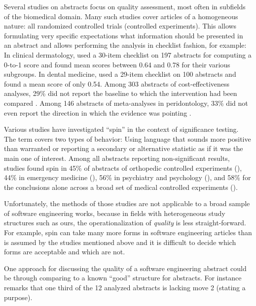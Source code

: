 \documentclass[10pt,journal,compsoc]{IEEEtran}
\begin{document}
Several studies on abstracts focus on quality assessment,
most often in subfields of the biomedical domain.
Many such studies cover articles of a homogeneous nature:
all randomized controlled trials (controlled experiments).
This allows formulating very specific expectations what information should be
presented in an abstract and allows performing the analysis in checklist fashion,
for example:
In clinical dermatology, \cite{DupKhoLeb03} used a 30-item checklist on 197 abstracts
  for computing a 0-to-1 score and found mean scores between 0.64 and 0.78 for their various subgroups.
In dental medicine, \cite{ShaHar06} used a 29-item checklist on 100 abstracts
  and found a mean score of only 0.54.
Among 303 abstracts of cost-effectiveness analyses,
  29\% did not report the baseline to which the intervention
  had been compared \cite{RosGreSto05}.
Among 146 abstracts of meta-analyses in peridontology, 
  33\% did not even report the direction in which  
  the evidence was pointing \cite{FagLiuHud14}.
  
Various studies have investigated ``spin'' in the context of significance testing.
The term covers two types of behavior: 
Using language that sounds more positive than warranted or
reporting a secondary or alternative statistic as if it was the main one of interest.
Among all abstracts reporting non-significant results, studies found spin in 
  45\% of abstracts of orthopedic controlled experiments (\cite{ArtZaaChe20}),
  44\% in emergency medicine (\cite{ReyRidBro20}),
  56\% in psychiatry and psychology (\cite{JelRobBow20}),
  and 58\% for the conclusions alone across a broad set of 
    medical controlled experiments (\cite{BouDutRav10}).

Unfortunately, the methods of those studies are not applicable to a 
broad sample of software engineering works, because
in fields with heterogeneous study structures such as ours, the operationalization of
\emph{quality} is less straight-forward.
For example, spin can take many more forms in software engineering articles
than is assumed by the studies mentioned above and it is difficult
to decide which forms are acceptable and which are not.

One approach for discussing the quality of a software engineering abstract 
could be through comparing to a known ``good'' structure for abstracts.
For instance~\cite{CroOpp06} remarks
that one third of the 12 analyzed abstracts is lacking move 2 (stating a purpose).
\end{document}
